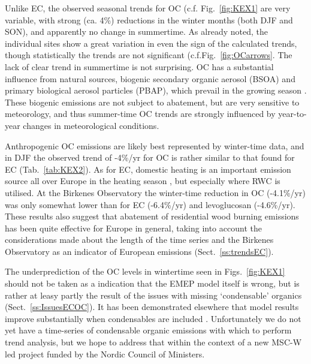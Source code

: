 Unlike EC, the observed seasonal trends for OC (c.f. Fig.~\ref{fig:KEX1} are very variable, with strong (ca. 4\%) reductions in the winter months (both DJF and SON), and apparently no change in summertime. As already noted, the individual sites show a great variation in even the sign of the calculated trends, though statistically the trends are not significant (c.f.Fig.~\ref{fig:OCarrows}. The lack of clear trend in summertime is not surprising. 
OC has a substantial influence from
natural sources, biogenic secondary organic aerosol (BSOA) and primary
biological aerosol particles (PBAP), which prevail in the growing season \citep[e.g.][]{Gelencser:CARB,Yttri2019}.
These biogenic emissions are not subject to abatement, but are very sensitive to meteorology, and thus summer-time OC trends are strongly influenced by year-to-year changes in meteorological conditions.

Anthropogenic OC emissions
are likely best represented by winter-time data, and in DJF the observed trend of -4\%/yr for OC is rather similar to that found for EC (Tab.~\ref{tab:KEX2}). As
for EC, domestic heating is an important emission source 
all over Europe in the heating season
\citep[e.g.][]{Yttri2019}, but especially where RWC is utilised.
At the Birkenes
Observatory the winter-time reduction in OC (-4.1\%/yr) was only somewhat
lower than for EC (-6.4\%/yr) and levoglucosan (-4.6\%/yr).
These results also suggest
that abatement of residential wood burning emissions has been quite
effective for Europe in general, taking into account the considerations
made about the length of the time series and the Birkenes Observatory as
an indicator of European emissions (Sect.~\ref{ss:trendsEC}).  

The underprediction of the OC levels in wintertime seen in Figs.~\ref{fig:KEX1} should not be taken as a indication that the EMEP model itself is wrong, but is rather at leasy partly the result of the issues with missing `condensable' organics (Sect.~\ref{ss:IssuesECOC}). It has been demonstrated elsewhere that model results improve substantially when condensables are included \citep{DeniervanderGon2015,R2019:SVOC,R2020:SVOC}. Unfortunately we do not yet have a time-series of condensable organic emissions with which to perform trend analysis, but we hope to address that within the context of a new MSC-W led project funded by the Nordic Council of Ministers.

